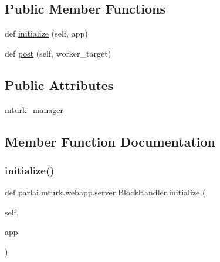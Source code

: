 \subsection*{Public Member Functions}
\begin{DoxyCompactItemize}
\item 
def \hyperlink{classparlai_1_1mturk_1_1webapp_1_1server_1_1BlockHandler_a65b2ae9ac54dc74f947e560654c5d6c3}{initialize} (self, app)
\item 
def \hyperlink{classparlai_1_1mturk_1_1webapp_1_1server_1_1BlockHandler_a8c9de27cced3819aaec3909b50d3b550}{post} (self, worker\+\_\+target)
\end{DoxyCompactItemize}
\subsection*{Public Attributes}
\begin{DoxyCompactItemize}
\item 
\hyperlink{classparlai_1_1mturk_1_1webapp_1_1server_1_1BlockHandler_a478088460fbd6c910d6ca6bcb01b7016}{mturk\+\_\+manager}
\end{DoxyCompactItemize}


\subsection{Member Function Documentation}
\mbox{\label{classparlai_1_1mturk_1_1webapp_1_1server_1_1BlockHandler_a65b2ae9ac54dc74f947e560654c5d6c3}} 
\subsubsection{\texorpdfstring{initialize()}{initialize()}}
{\footnotesize\ttfamily def parlai.\+mturk.\+webapp.\+server.\+Block\+Handler.\+initialize (\begin{DoxyParamCaption}\item[{}]{self,  }\item[{}]{app }\end{DoxyParamCaption})}

\mbox{\label{classparlai_1_1mturk_1_1webapp_1_1server_1_1BlockHandler_a8c9de27cced3819aaec3909b50d3b550}} 
